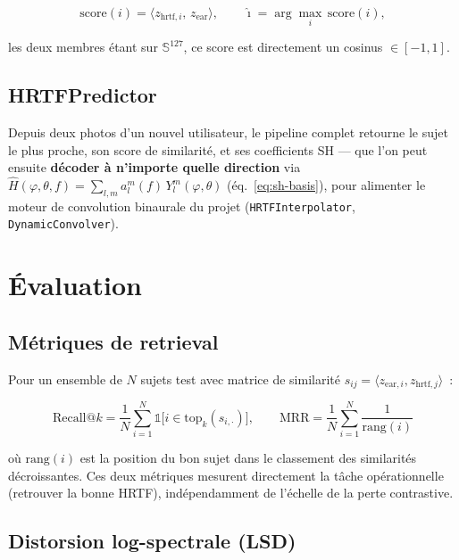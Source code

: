 \documentclass[12pt, a4paper]{article}
\begin{document}
\begin{equation}
    \mathrm{score}(i) = \langle z_{\mathrm{hrtf},i},\, z_{\mathrm{ear}} \rangle,
    \qquad
    \hat{\imath} = \arg\max_i\, \mathrm{score}(i),
\end{equation}

les deux membres étant sur $\mathbb{S}^{127}$, ce score est directement un
cosinus $\in[-1,1]$.

\subsection{HRTFPredictor}

Depuis deux photos d'un nouvel utilisateur, le pipeline complet retourne le
sujet le plus proche, son score de similarité, et ses coefficients SH — que
l'on peut ensuite \textbf{décoder à n'importe quelle direction} via
$\hat{H}(\varphi,\theta,f)=\sum_{l,m} a_l^m(f)\,Y_l^m(\varphi,\theta)$
(éq.~\eqref{eq:sh-basis}), pour alimenter le moteur de convolution binaurale
du projet (\texttt{HRTFInterpolator}, \texttt{DynamicConvolver}).

\section{Évaluation}
\label{sec:evaluation}

\subsection{Métriques de retrieval}

Pour un ensemble de $N$ sujets test avec matrice de similarité
$s_{ij}=\langle z_{\mathrm{ear},i}, z_{\mathrm{hrtf},j}\rangle$~:

\begin{equation}
    \mathrm{Recall@}k = \frac{1}{N}\sum_{i=1}^N
    \mathbb{1}\bigl[i \in \mathrm{top}_k(s_{i,\cdot})\bigr],
    \qquad
    \mathrm{MRR} = \frac{1}{N}\sum_{i=1}^N \frac{1}{\mathrm{rang}(i)}
\end{equation}

où $\mathrm{rang}(i)$ est la position du bon sujet dans le classement des
similarités décroissantes. Ces deux métriques mesurent directement la tâche
opérationnelle (retrouver la bonne HRTF), indépendamment de l'échelle de
la perte contrastive.

\subsection{Distorsion log-spectrale (LSD)}
\end{document}
